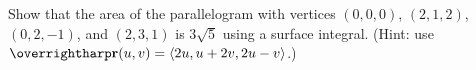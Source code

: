 \documentclass[letterpaper, twoside, 12pt]{book}
\begin{document}
          \begin{solution}

          \end{solution}

          \begin{contributors}

          \end{contributors}

          \begin{problem}
            Show that the area of the parallelogram with vertices $(0,0,0)$,
            $(2,1,2)$, $(0,2,-1)$, and $(2,3,1)$ is $3\sqrt{5}$ using a surface
            integral.
            (Hint: use $\vect{r}(u,v)=\<2u,u+2v,2u-v\>$.)
          \end{problem}

          \begin{solution}

          \end{solution}

          \begin{contributors}

          \end{contributors}
\end{document}

